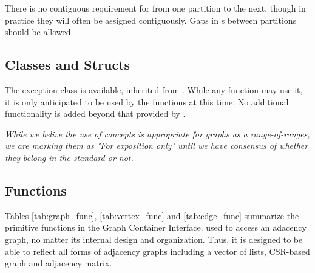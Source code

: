 There is no contiguous requirement for  from one partition to the next, though
in practice they will often be assigned contiguously. Gaps in s between partitions should be allowed.

\subsection{Classes and Structs}

The  exception class is available, inherited from . While any function may use it, it 
is only anticipated to be used by the  functions at this time.
No additional functionality is added beyond that provided by .

\emph{While we belive the use of concepts is appropriate for graphs as a range-of-ranges, we are marking them as "For exposition only" 
until we have consensus of whether they belong in the standard or not.}

\subsection{Functions}

Tables \ref{tab:graph_func}, \ref{tab:vertex_func} and \ref{tab:edge_func} summarize the primitive functions in the Graph Container Interface.
used to access an adacency graph, no matter its internal design and organization. Thus, it is designed 
to be able to reflect all forms of adjacency graphs including a vector of lists, CSR-based graph and adjacency matrix.


